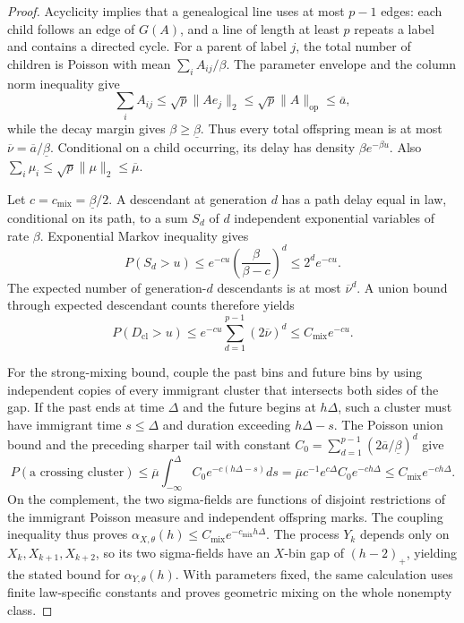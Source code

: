 \documentclass{article}
\begin{document}
\begin{proof}
Acyclicity implies that a genealogical line uses at most \(p-1\) edges: each child follows an edge of \(G(A)\), and a line of length at least \(p\) repeats a label and contains a directed cycle.  For a parent of label \(j\), the total number of children is Poisson with mean \(\sum_iA_{ij}/\beta\).  The parameter envelope and the column norm inequality give
\[
 \sum_iA_{ij}\leq\sqrt p\|Ae_j\|_2\leq\sqrt p\|A\|_{\mathrm{op}}\leq\overline a,
\]
while the decay margin gives \(\beta\geq\underline\beta\).  Thus every total offspring mean is at most \(\overline\nu=\overline a/\underline\beta\).  Conditional on a child occurring, its delay has density \(\beta e^{-\beta u}\).  Also \(\sum_i\mu_i\leq\sqrt p\|\mu\|_2\leq\overline\mu\).

Let \(c=c_{\mathrm{mix}}=\underline\beta/2\).  A descendant at generation \(d\) has a path delay equal in law, conditional on its path, to a sum \(S_d\) of \(d\) independent exponential variables of rate \(\beta\).  Exponential Markov inequality gives
\[
 P(S_d>u)\leq e^{-cu}\left(\frac{\beta}{\beta-c}\right)^d\leq2^de^{-cu}.
\]
The expected number of generation-\(d\) descendants is at most \(\overline\nu^d\).  A union bound through expected descendant counts therefore yields
\[
 P(D_{\mathrm{cl}}>u)\leq e^{-cu}\sum_{d=1}^{p-1}(2\overline\nu)^d
 \leq C_{\mathrm{mix}}e^{-cu}.
\]

For the strong-mixing bound, couple the past bins and future bins by using independent copies of every immigrant cluster that intersects both sides of the gap.  If the past ends at time \(\Delta\) and the future begins at \(h\Delta\), such a cluster must have immigrant time \(s\leq\Delta\) and duration exceeding \(h\Delta-s\).  The Poisson union bound and the preceding sharper tail with constant \(C_0=\sum_{d=1}^{p-1}(2\overline a/\underline\beta)^d\) give
\[
 P(\text{a crossing cluster})
 \leq\overline\mu\int_{-\infty}^{\Delta}C_0e^{-c(h\Delta-s)}ds
 =\overline\mu c^{-1}e^{c\Delta}C_0e^{-ch\Delta}
 \leq C_{\mathrm{mix}}e^{-ch\Delta}.
\]
On the complement, the two sigma-fields are functions of disjoint restrictions of the immigrant Poisson measure and independent offspring marks.  The coupling inequality thus proves \(\alpha_{X,\theta}(h)\leq C_{\mathrm{mix}}e^{-c_{\mathrm{mix}}h\Delta}\).  The process \(Y_k\) depends only on \(X_k,X_{k+1},X_{k+2}\), so its two sigma-fields have an \(X\)-bin gap of \((h-2)_+\), yielding the stated bound for \(\alpha_{Y,\theta}(h)\).  With parameters fixed, the same calculation uses finite law-specific constants and proves geometric mixing on the whole nonempty class.
\end{proof}
\end{document}
